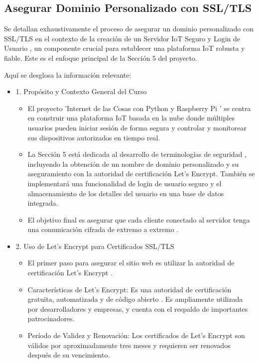 \documentclass{report}
\begin{document}
\subsection{Asegurar Dominio Personalizado con SSL/TLS}
Se detallan exhaustivamente el proceso de  asegurar un dominio personalizado con SSL/TLS  en el contexto de la creación de un  Servidor IoT 
Seguro y Login de Usuario , un componente crucial para establecer una plataforma IoT robusta y fiable. Este es el enfoque principal de la Sección 5 
del proyecto.

Aquí se desglosa la información relevante:
\begin{itemize}
    \item 1. Propósito y Contexto General del Curso
    \begin{itemize}
        \item El proyecto  'Internet de las Cosas con Python y Raspberry Pi ' se centra en construir una  plataforma IoT basada en la nube  donde 
        múltiples usuarios pueden iniciar sesión de forma segura y controlar y monitorear sus dispositivos autorizados en tiempo real.
        \item La Sección 5 está dedicada al  desarrollo de terminologías de seguridad , incluyendo la obtención de un nombre de dominio personalizado 
        y su aseguramiento con la autoridad de certificación Let's Encrypt. También se implementará una funcionalidad de login de usuario seguro y el 
        almacenamiento de los detalles del usuario en una base de datos integrada.
        \item El objetivo final es asegurar que cada cliente conectado al servidor tenga una  comunicación cifrada de extremo a extremo .
    \end{itemize}

    \item 2. Uso de Let's Encrypt para Certificados SSL/TLS
    \begin{itemize}
        \item El primer paso para asegurar el sitio web es utilizar la  autoridad de certificación Let's Encrypt .
        \item Características de Let's Encrypt: Es una autoridad de certificación  gratuita, automatizada y de código abierto . Es ampliamente 
        utilizada por desarrolladores y empresas, y cuenta con el respaldo de importantes patrocinadores.
        \item Período de Validez y Renovación: Los certificados de Let's Encrypt son  válidos por aproximadamente tres meses  y requieren ser 
        renovados después de su vencimiento.
    \end{itemize}


\end{itemize}
\end{document}
